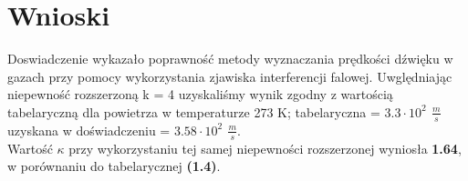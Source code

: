 \documentclass{article}
\begin{document}
\section{Wnioski}

Doswiadczenie wykazało poprawność metody wyznaczania prędkości dźwięku w gazach przy pomocy wykorzystania zjawiska interferencji falowej.
Uwględniając niepewność rozszerzoną k = 4 uzyskaliśmy wynik zgodny z wartością tabelaryczną dla powietrza w temperaturze 273 K;
tabelaryczna = \textbf{$3.3 \cdot 10^{2}$ $\frac{m}{s}$} uzyskana w doświadczeniu = \textbf{\textbf{$3.58 \cdot 10^2$} $\frac{m}{s}$}. 
\\
Wartość $\kappa$ przy wykorzystaniu tej samej niepewności rozszerzonej wyniosła \textbf{1.64}, w porównaniu do tabelarycznej \textbf{(1.4)}.






\end{document}
